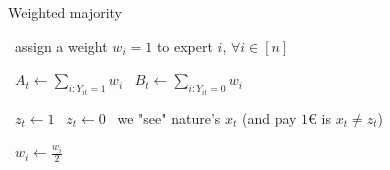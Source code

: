 \begin{algorithm}
    \caption{Weighted majority}\label{alg:weight_majority}
    \begin{algorithmic}%
            \State~assign a weight $w_i = 1$ to expert $i$, $\forall i \in [n]$

                \State~$A_t \gets \sum_{i : Y_{it}=1} w_i$
                \State~$B_t \gets \sum_{i : Y_{it}=0} w_i$

                    \State~$z_t \gets 1$
                \Else
                    \State~$z_t \gets 0$
                \EndIf
                \State~we "see" nature's $x_t$ (and pay $1$€ is $x_t \neq z_t$)

                        \State~$w_i \gets \frac{w_i}{2}$
                    \EndIf
                \EndFor
            \EndFor
    \end{algorithmic}
\end{algorithm}